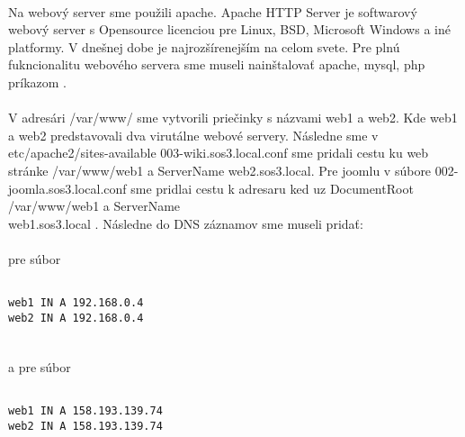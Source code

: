\paragraph{}
Na webový server sme použili apache. Apache HTTP Server je softwarový webový server s Opensource licenciou pre Linux, BSD, Microsoft Windows a iné platformy. V dnešnej dobe je najrozšírenejším na celom svete. Pre plnú fukncionalitu webového servera sme museli nainštalovať apache, mysql, php príkazom  .
\paragraph{}
V adresári /var/www/ sme vytvorili priečinky s názvami web1 a web2. Kde web1 a web2 predstavovali dva virutálne webové servery. Následne sme v etc/apache2/sites-available 003-wiki.sos3.local.conf sme pridali cestu ku web stránke /var/www/web1 a ServerName web2.sos3.local. Pre joomlu v súbore 002-joomla.sos3.local.conf sme pridlai cestu k adresaru ked uz DocumentRoot /var/www/web1 a ServerName\\ web1.sos3.local . Následne do DNS záznamov sme museli pridať:	

\paragraph{}
pre súbor 

\noindent
{\selectfont

\begin{small}

\begin{verbatim}

web1 IN A 192.168.0.4
web2 IN A 192.168.0.4


\end{verbatim}
\end{small}
}

\paragraph{}
a pre súbor 

\noindent
{\selectfont
\begin{small}
\begin{verbatim}

web1 IN A 158.193.139.74
web2 IN A 158.193.139.74

\end{verbatim}
\end{small}
}





